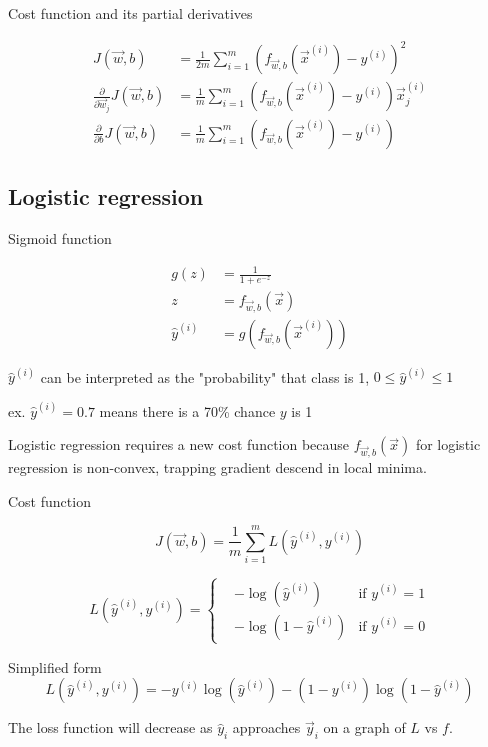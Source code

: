 \documentclass[12pt]{article}
\begin{document}
Cost function and its partial derivatives

\begin{align*}
    J(\vec{w},b) &= \frac{1}{2m} \sum_{i=1}^{m} (f_{\vec{w},b}(\vec{x}^{(i)}) - y^{(i)})^2\\
    \frac{\partial}{\partial \vec{w}_j} J(\vec{w},b) &= \frac{1}{m} \sum_{i=1}^{m} (f_{\vec{w},b}(\vec{x}^{(i)}) - y^{(i)}) \vec{x}^{(i)}_j\\
    \frac{\partial}{\partial b} J(\vec{w},b) &= \frac{1}{m} \sum_{i=1}^{m} (f_{\vec{w},b}(\vec x^{(i)}) - y^{(i)})
\end{align*}

\subsection{Logistic regression}

Sigmoid function

\begin{align*}
    g(z) &= \frac{1}{1 + e^{-z}}\\
    z &= f_{\vec{w},b}(\vec{x})\\
    \hat{y}^{(i)} &= g(f_{\vec{w},b}(\vec x^{(i)}))
\end{align*}

$\hat{y}^{(i)}$ can be interpreted as the "probability" that class is 1, $0 \leq \hat{y}^{(i)} \leq 1$

ex. $\hat{y}^{(i)} = 0.7$ means there is a 70\% chance $y$ is 1

Logistic regression requires a new cost function because $f_{\vec{w},b}(\vec{x})$ for logistic regression is non-convex, trapping gradient descend in local minima.

Cost function

\[ J(\vec{w},b) = \frac{1}{m} \sum_{i=1}^{m} L(\hat{y}^{(i)},y^{(i)}) \]

\begin{equation*}
L(\hat{y}^{(i)},y^{(i)}) = 
  \left\{
    \begin{aligned}
      & -\log(\hat{y}^{(i)}) & \text{if } y^{(i)} = 1 \\
      & -\log(1 - \hat{y}^{(i)}) & \text{if } y^{(i)} = 0
    \end{aligned}
  \right.
\end{equation*}

Simplified form
\[ L(\hat{y}^{(i)}, y^{(i)}) = -y^{(i)} \log(\hat{y}^{(i)}) - (1 - y^{(i)}) \log (1 - \hat{y}^{(i)}) \]

The loss function will decrease as $\hat{y}_i$ approaches $\vec{y}_i$ on a graph of $L$ vs $f$.
\end{document}
